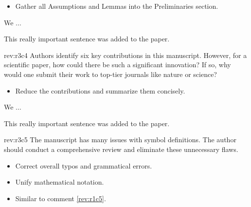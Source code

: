 \documentclass[12pt,english]{reviewresponse}
\begin{document}
\begin{howtoanswer}
    \begin{itemize}
        \item Gather all Assumptions and Lemmas into the Preliminaries section.
    \end{itemize}
\end{howtoanswer}

\begin{revresponse}
    We ...
    \begin{changes}
        This really important sentence was added to the paper.
    \end{changes}
\end{revresponse}

\begin{revcomment}[3]{rev:r3c4}
    Authors identify six key contributions in this manuscript. However, for a scientific paper, how could there be such a significant innovation? If so, why would one submit their work to top-tier journals like nature or science?
\end{revcomment}

\begin{howtoanswer}
    \begin{itemize}
        \item Reduce the contributions and summarize them concisely.
    \end{itemize}
\end{howtoanswer}

\begin{revresponse}
    We ...
    \begin{changes}
        This really important sentence was added to the paper.
    \end{changes}
\end{revresponse}

\begin{revcomment}[3]{rev:r3c5}
    The manuscript has many issues with symbol definitions. The author should conduct a comprehensive review and eliminate these unnecessary flaws.
\end{revcomment}

\begin{howtoanswer}
    \begin{itemize}
        \item Correct overall typos and grammatical errors.
        \item Unify mathematical notation.
        \item Similar to comment \cref{rev:r1c5}.
    \end{itemize}
\end{howtoanswer}
\end{document}
